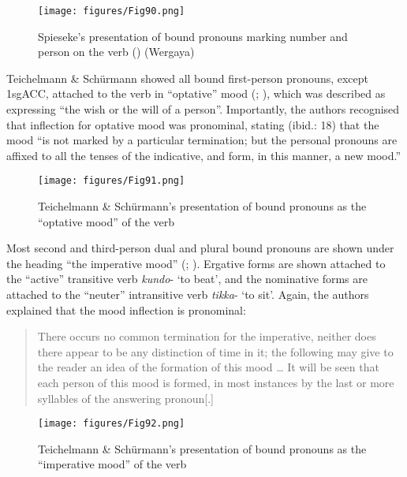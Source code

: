 \begin{figure}
\texttt{[image: figures/Fig90.png]}
\caption{\label{fig:5:90}Spieseke's presentation of bound pronouns marking number and person on the verb (\citeyear[57]{Spieseke1878}) (Wergaya)}
\end{figure}


Teichelmann \& Schürmann showed all bound first-person pronouns, except 1sgACC, attached to the verb in “optative” mood (\citeyear[18]{teichelmann_outlines_1840}; ), which was described as expressing “the wish or the will of a person”. Importantly, the authors recognised that inflection for optative mood was pronominal, stating (ibid.: 18) that the mood “is not marked by a particular termination; but the personal pronouns are affixed to all the tenses of the indicative, and form, in this manner, a new mood.”
 
\begin{figure}
\texttt{[image: figures/Fig91.png]}
\caption{\label{fig:5:91}Teichelmann \& Schürmann’s presentation of bound pronouns as the “optative mood” of the verb \citeyearpar[18]{teichelmann_outlines_1840}}
\end{figure}


Most second and third-person dual and plural bound pronouns are shown under the heading “the imperative mood” (\citeyear[17]{teichelmann_outlines_1840}; ). Ergative forms are shown attached to the “active” transitive verb \textit{kundo}- `to beat', and the nominative forms are attached to the “neuter” intransitive verb \textit{tikka}- `to sit'. Again, the authors explained that the mood inflection is pronominal:

\begin{quote}
    There occurs no common termination for the imperative, neither does there appear to be any distinction of time in it; the following may give to the reader an idea of the formation of this mood … It will be seen that each person of this mood is formed, in most instances by the last or more syllables of the answering pronoun[.] \citep[17]{teichelmann_outlines_1840}
\end{quote}

 
\begin{figure}
\texttt{[image: figures/Fig92.png]}
\caption{\label{fig:5:92}Teichelmann \& Schürmann’s presentation of bound pronouns as the “imperative mood” of the verb \citeyearpar[17]{teichelmann_outlines_1840}}
\end{figure}


